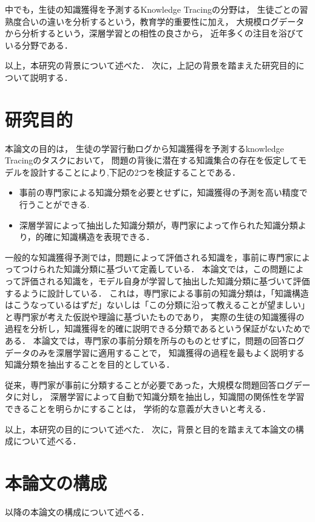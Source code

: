 中でも，生徒の知識獲得を予測するKnowledge Tracingの分野は，
生徒ごとの習熟度合いの違いを分析するという，教育学的重要性に加え，
大規模ログデータから分析するという，深層学習との相性の良さから，
近年多くの注目を浴びている分野である．



\vvspace
以上，本研究の背景について述べた．
次に，上記の背景を踏まえた研究目的について説明する．

\section{研究目的}

本論文の目的は，
生徒の学習行動ログから知識獲得を予測するknowledge Tracingのタスクにおいて，
問題の背後に潜在する知識集合の存在を仮定してモデルを設計することにより,下記の2つを検証することである．
\begin{itemize}
\item 事前の専門家による知識分類を必要とせずに，知識獲得の予測を高い精度で行うことができる.
\item 深層学習によって抽出した知識分類が，専門家によって作られた知識分類より，的確に知識構造を表現できる．
\end{itemize}
一般的な知識獲得予測では，問題によって評価される知識を，事前に専門家によってつけられた知識分類に基づいて定義している．
本論文では，この問題によって評価される知識を，モデル自身が学習して抽出した知識分類に基づいて評価するように設計している．
これは，専門家による事前の知識分類は，「知識構造はこうなっているはずだ」ないしは「この分類に沿って教えることが望ましい」と専門家が考えた仮説や理論に基づいたものであり，
実際の生徒の知識獲得の過程を分析し，知識獲得を的確に説明できる分類であるという保証がないためである．
本論文では，専門家の事前分類を所与のものとせずに，問題の回答ログデータのみを深層学習に適用することで，
知識獲得の過程を最もよく説明する知識分類を抽出することを目的としている．

従来，専門家が事前に分類することが必要であった，大規模な問題回答ログデータに対し，
深層学習によって自動で知識分類を抽出し，知識間の関係性を学習できることを明らかにすることは，
学術的な意義が大きいと考える．


\vvspace
以上，本研究の目的について述べた．
次に，背景と目的を踏まえて本論文の構成について述べる．



\section{本論文の構成}
以降の本論文の構成について述べる．

